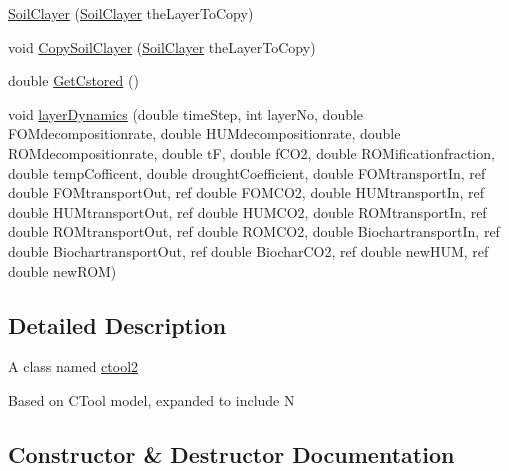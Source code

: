 \begin{DoxyCompactItemize}
\item 
\mbox{\hyperlink{class_soil_clayer_af6c5d1771dfa373500e42dad9e2afd9a}{Soil\+Clayer}} (\mbox{\hyperlink{class_soil_clayer}{Soil\+Clayer}} the\+Layer\+To\+Copy)
\item 
void \mbox{\hyperlink{class_soil_clayer_a69593b3579da59ceffba75eb36925dbe}{Copy\+Soil\+Clayer}} (\mbox{\hyperlink{class_soil_clayer}{Soil\+Clayer}} the\+Layer\+To\+Copy)
\item 
double \mbox{\hyperlink{class_soil_clayer_a923605f07e10f457141e5591ec5c1474}{Get\+Cstored}} ()
\item 
void \mbox{\hyperlink{class_soil_clayer_aad1857ed846342af4b6a152e0d6a9dd8}{layer\+Dynamics}} (double time\+Step, int layer\+No, double F\+O\+Mdecompositionrate, double H\+U\+Mdecompositionrate, double R\+O\+Mdecompositionrate, double tF, double f\+C\+O2, double R\+O\+Mificationfraction, double temp\+Cofficent, double drought\+Coefficient, double F\+O\+Mtransport\+In, ref double F\+O\+Mtransport\+Out, ref double F\+O\+M\+C\+O2, double H\+U\+Mtransport\+In, ref double H\+U\+Mtransport\+Out, ref double H\+U\+M\+C\+O2, double R\+O\+Mtransport\+In, ref double R\+O\+Mtransport\+Out, ref double R\+O\+M\+C\+O2, double Biochartransport\+In, ref double Biochartransport\+Out, ref double Biochar\+C\+O2, ref double new\+H\+UM, ref double new\+R\+OM)
\end{DoxyCompactItemize}


\subsection{Detailed Description}
A class named \mbox{\hyperlink{classctool2}{ctool2}}

Based on C\+Tool model, expanded to include N 

\subsection{Constructor \& Destructor Documentation}
\mbox{\label{class_soil_clayer_a15c997e1a6abeee1477fdac2bf0ecb6b}} 
